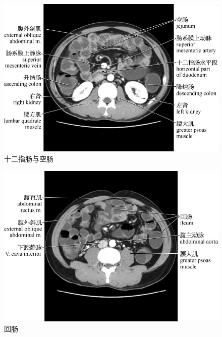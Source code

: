 \begin{figure}[!htbp]
 \centering
 \includegraphics{./images/Image00170.jpg}
 \captionsetup{justification=centering}
 \caption{十二指肠与空肠}
  \end{figure} 
 \FloatBarrier

\begin{figure}[!htbp]
 \centering
 \includegraphics{./images/Image00171.jpg}
 \captionsetup{justification=centering}
 \caption{回肠}
  \end{figure} 
 \FloatBarrier

